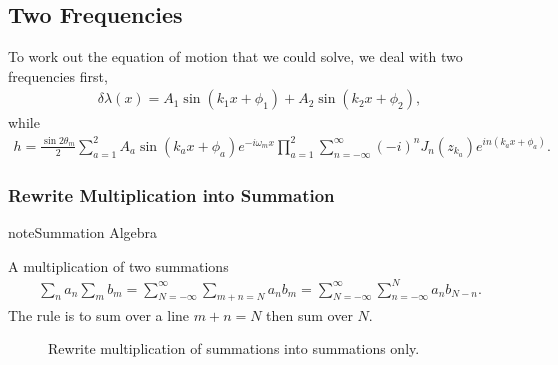 \documentclass[letterpaper,12pt,english]{sphinxmanual}
\begin{document}
\subsection{Two Frequencies}
\label{\detokenize{matter-stimulated/two-frequency:two-frequencies}}
To work out the equation of motion that we could solve, we deal with two frequencies first,
\begin{equation*}
\begin{split}\delta \lambda ( x ) = A_1\sin (k_1 x + \phi_1) + A_2 \sin (k_2 x + \phi_2),\end{split}
\end{equation*}
while
\begin{equation*}
\begin{split}h = \frac{\sin 2\theta_m}{2} \sum_{a = 1}^2 A_a \sin (k_a x + \phi_a) e^{-i\omega_m x}\prod_{a=1}^2 \sum_{n=-\infty}^{\infty} (-i)^n J_n (z_{k_a}) e^{i n(k_a x + \phi_a) }.\end{split}
\end{equation*}

\subsubsection{Rewrite Multiplication into Summation}
\label{\detokenize{matter-stimulated/two-frequency:rewrite-multiplication-into-summation}}
\begin{sphinxadmonition}{note}{Summation Algebra}

A multiplication of two summations
\label{\detokenize{matter-stimulated/two-frequency:equation-multiplication-summation-rule}}\begin{equation}\label{equation:matter-stimulated/two-frequency:multiplication-summation-rule}
\begin{split}\sum_n a_n \sum_m b_m  = \sum_{N = -\infty}^{\infty} \sum_{m+n=N} a_n b_m = \sum_{N=-\infty}^\infty \sum_{n=-\infty}^{N} a_n b_{N-n}.\end{split}
\end{equation}
The rule is to sum over a line \(m+n=N\) then sum over \(N\).
\begin{figure}[htbp]
\centering
\capstart

\noindent{}
\caption{Rewrite multiplication of summations into summations only.}\label{\detokenize{matter-stimulated/two-frequency:id1}}\end{figure}
\end{sphinxadmonition}
\end{document}
